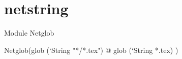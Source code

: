 \section{netstring}



Module Netglob

\begin{ocamlcode}
Netglob(glob (`String "*/*.tex") @
glob (`String *.tex)
)
\end{ocamlcode}
